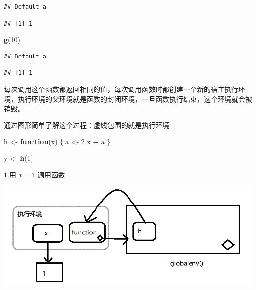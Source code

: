 \documentclass[]{book}
\newenvironment{Shaded}{\begin{snugshade}}{\end{snugshade}}
\newcommand{\KeywordTok}[1]{\textcolor[rgb]{0.13,0.29,0.53}{\textbf{#1}}}
\newcommand{\DecValTok}[1]{\textcolor[rgb]{0.00,0.00,0.81}{#1}}
\newcommand{\StringTok}[1]{\textcolor[rgb]{0.31,0.60,0.02}{#1}}
\newcommand{\ControlFlowTok}[1]{\textcolor[rgb]{0.13,0.29,0.53}{\textbf{#1}}}
\newcommand{\OperatorTok}[1]{\textcolor[rgb]{0.81,0.36,0.00}{\textbf{#1}}}
\newcommand{\NormalTok}[1]{#1}
\begin{document}
\begin{verbatim}
## Default a
\end{verbatim}

\begin{verbatim}
## [1] 1
\end{verbatim}

\begin{Shaded}
\begin{Highlighting}[]
\KeywordTok{g}\NormalTok{(}\DecValTok{10}\NormalTok{)}
\end{Highlighting}
\end{Shaded}

\begin{verbatim}
## Default a
\end{verbatim}

\begin{verbatim}
## [1] 1
\end{verbatim}

每次调用这个函数都返回相同的值，每次调用函数时都创建一个新的宿主执行环境，执行环境的父环境就是函数的封闭环境，一旦函数执行结束，这个环境就会被销毁。

通过图形简单了解这个过程：虚线包围的就是执行环境

\begin{Shaded}
\begin{Highlighting}[]
\NormalTok{h <-}\StringTok{ }\ControlFlowTok{function}\NormalTok{(x) \{}
\NormalTok{  a <-}\StringTok{ }\DecValTok{2}
\NormalTok{  x }\OperatorTok{+}\StringTok{ }\NormalTok{a}
\NormalTok{\}}

\NormalTok{y <-}\StringTok{ }\KeywordTok{h}\NormalTok{(}\DecValTok{1}\NormalTok{)}
\end{Highlighting}
\end{Shaded}

1.用 \(x=1\) 调用函数

\begin{center}\includegraphics{img/ch7-10} \end{center}
\end{document}
